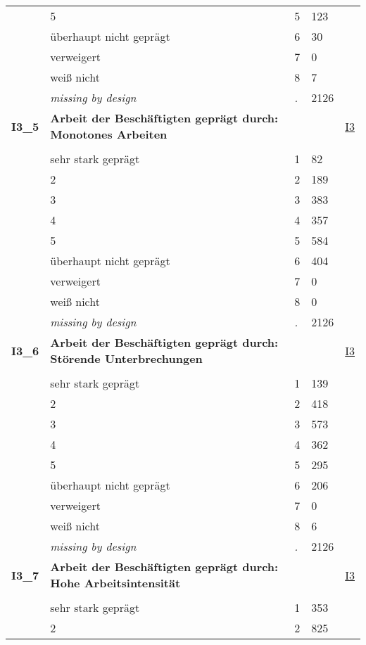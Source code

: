 \begin{longtable}{| L{2.65cm} | L{8cm} | C{1.5cm} | R{1.25cm} | C{2.25cm}  |}
   & 5 & 5 & 123 &  \\ 
   & überhaupt nicht geprägt & 6 & 30 &  \\ 
   & verweigert & 7 & 0 &  \\ 
   & weiß nicht & 8 & 7 &  \\ 
   & \textit{missing by design} & \textit{.} & 2126 &  \\ 
   \midrule
\textbf{I3\_5}\label{var:I3:5} & \textbf{Arbeit der Beschäftigten geprägt durch: Monotones Arbeiten} &  &  & \hyperref[I3]{I3} \\ 
   &  &  &  &  \\ 
   & sehr stark geprägt & 1 & 82 &  \\ 
   & 2 & 2 & 189 &  \\ 
   & 3 & 3 & 383 &  \\ 
   & 4 & 4 & 357 &  \\ 
   & 5 & 5 & 584 &  \\ 
   & überhaupt nicht geprägt & 6 & 404 &  \\ 
   & verweigert & 7 & 0 &  \\ 
   & weiß nicht & 8 & 0 &  \\ 
   & \textit{missing by design} & \textit{.} & 2126 &  \\ 
   \midrule
\textbf{I3\_6}\label{var:I3:6} & \textbf{Arbeit der Beschäftigten geprägt durch: Störende Unterbrechungen} &  &  & \hyperref[I3]{I3} \\ 
   &  &  &  &  \\ 
   & sehr stark geprägt & 1 & 139 &  \\ 
   & 2 & 2 & 418 &  \\ 
   & 3 & 3 & 573 &  \\ 
   & 4 & 4 & 362 &  \\ 
   & 5 & 5 & 295 &  \\ 
   & überhaupt nicht geprägt & 6 & 206 &  \\ 
   & verweigert & 7 & 0 &  \\ 
   & weiß nicht & 8 & 6 &  \\ 
   & \textit{missing by design} & \textit{.} & 2126 &  \\ 
   \midrule
\textbf{I3\_7}\label{var:I3:7} & \textbf{Arbeit der Beschäftigten geprägt durch: Hohe Arbeitsintensität} &  &  & \hyperref[I3]{I3} \\ 
   &  &  &  &  \\ 
   & sehr stark geprägt & 1 & 353 &  \\ 
   & 2 & 2 & 825 &  \\ 

\end{longtable}
